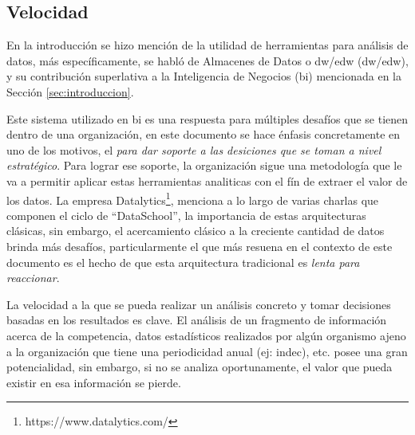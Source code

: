\subsection{Velocidad} \label{ssec:velocidad}

En la introducción se hizo mención de la utilidad de herramientas para
análisis de datos, más específicamente, se habló de Almacenes de Datos o 
\acrlong{dw}/\acrlong{edw} (\acrshort{dw}/\acrshort{edw}), y su contribución
superlativa a la Inteligencia de Negocios (\acrshort{bi}) mencionada en la
Sección \ref{sec:introduccion}.

Este sistema utilizado en \acrshort{bi} es una respuesta para múltiples
desafíos que se tienen dentro de una organización\cite{datalytics2}, en este
documento se hace énfasis concretamente en uno de los motivos, el 
\textit{para dar soporte a las desiciones que se toman a nivel estratégico}.
Para lograr ese soporte, la organización 
sigue una metodología que le va a permitir aplicar estas herramientas
analiticas con el fín de extraer el valor de los datos. La empresa
Datalytics\footnote{https://www.datalytics.com/}, menciona a lo largo de varias
charlas que componen el ciclo de ``DataSchool'', la importancia de estas
arquitecturas clásicas, sin embargo, el acercamiento clásico a la creciente
cantidad de datos brinda más desafíos, particularmente el que más resuena en el
contexto de este documento es el hecho de que esta arquitectura tradicional es 
\textit{lenta para reaccionar}\cite{datalytics3}.

La velocidad a la que se pueda realizar un análisis concreto y
tomar decisiones basadas en los resultados es clave. El análisis de un
fragmento de información acerca de la competencia, datos estadísticos realizados
por algún organismo ajeno a la organización que tiene una periodicidad anual
(ej: \acrshort{indec}), etc. posee una gran potencialidad, sin embargo, si no
se analiza oportunamente, el valor que pueda existir en esa información se
pierde.



